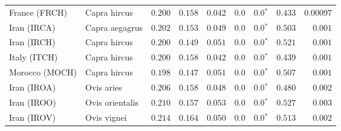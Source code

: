 \begin{center}
\begin{adjustbox}{width = 1\textwidth}
\begin{tabular}{|l|l|r|r|r|r|r|r|r|}
                  France (FRCH) &         Capra hircus &                                        $ 0.200$ &                                           $ 0.158$ &                      $ 0.042$ &            $0.0$ &                  $\bm{0.0{^*}}$ &                                           $ 0.433$ &          $0.00097$ \\
                    Iran (IRCA) &       Capra aegagrus &                                        $ 0.202$ &                                           $ 0.153$ &                      $ 0.049$ &            $0.0$ &                  $\bm{0.0{^*}}$ &                                           $ 0.503$ &           $ 0.001$ \\
                    Iran (IRCH) &         Capra hircus &                                        $ 0.200$ &                                           $ 0.149$ &                      $ 0.051$ &            $0.0$ &                  $\bm{0.0{^*}}$ &                                           $ 0.521$ &           $ 0.001$ \\
                   Italy (ITCH) &         Capra hircus &                                        $ 0.200$ &                                           $ 0.158$ &                      $ 0.042$ &            $0.0$ &                  $\bm{0.0{^*}}$ &                                           $ 0.439$ &           $ 0.001$ \\
                 Morocco (MOCH) &         Capra hircus &                                        $ 0.198$ &                                           $ 0.147$ &                      $ 0.051$ &            $0.0$ &                  $\bm{0.0{^*}}$ &                                           $ 0.507$ &           $ 0.001$ \\
                    Iran (IROA) &           Ovis aries &                                        $ 0.206$ &                                           $ 0.158$ &                      $ 0.048$ &            $0.0$ &                  $\bm{0.0{^*}}$ &                                           $ 0.480$ &           $ 0.002$ \\
                    Iran (IROO) &      Ovis orientalis &                                        $ 0.210$ &                                           $ 0.157$ &                      $ 0.053$ &            $0.0$ &                  $\bm{0.0{^*}}$ &                                           $ 0.527$ &           $ 0.003$ \\
                    Iran (IROV) &          Ovis vignei &                                        $ 0.214$ &                                           $ 0.164$ &                      $ 0.050$ &            $0.0$ &                  $\bm{0.0{^*}}$ &                                           $ 0.513$ &           $ 0.002$ \\

\end{tabular}
\end{adjustbox}
\end{center}
